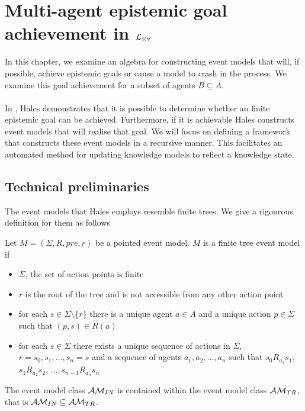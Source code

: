 \section{Multi-agent epistemic goal achievement in $\mathcal{L}_{\otimes\forall}$}

In this chapter, we examine an algebra for constructing event models that will, if possible, achieve
epistemic goals or cause a model to crash in the process.
We examine this goal achievement for a subset of agents $B \subseteq A$.\\
\\
In \cite{hales13synthesis}, Hales demonstrates that it is possible to determine whether an
finite epistemic goal can be achieved.
Furthermore, if it is achievable Hales constructs event models that will realise
that goal.
We will focus on defining a framework that constructs these event models in a
recursive manner.
This facilitates an automated method for updating knowledge models to reflect a
knowledge state.

\subsection{Technical preliminaries}

The event models that Hales employs resemble finite trees.
We give a rigourous definition for them as follows

\begin{defn} \label{finTree}
Let $M = (\Sigma, R, pre, r)$ be a pointed event model.
$M$ is a finite tree event model if
\begin{itemize}
	\item $\Sigma$, the set of action points is finite
	\item $r$ is the root of the tree and is not accessible from any other action point
	\item for each $s \in \Sigma \setminus \{ r \}$ there is a unique agent $a \in A$ and a unique
	action $p \in \Sigma$ such that $(p,s) \in R(a)$
	\item for each $s \in \Sigma$ there exists a unique sequence of actions in $\Sigma$, $r = s_0,
	s_1, \ldots, s_n = s$ and a sequence of agents $a_1, a_2, \ldots, a_n$ such that $s_0 R_{a_1}
	s_1$, $s_1 R_{a_2} s_2$, $\ldots, s_{n-1} R_{a_n} s_n$
\end{itemize}
\end{defn}

\begin{lemma} \label{insaneIsTree}
The event model class $\mathcal{AM}_{IN}$ is contained within the event model class
$\mathcal{AM}_{TR}$, that is $\mathcal{AM}_{IN} \subseteq \mathcal{AM}_{TR}$.
\end{lemma}

